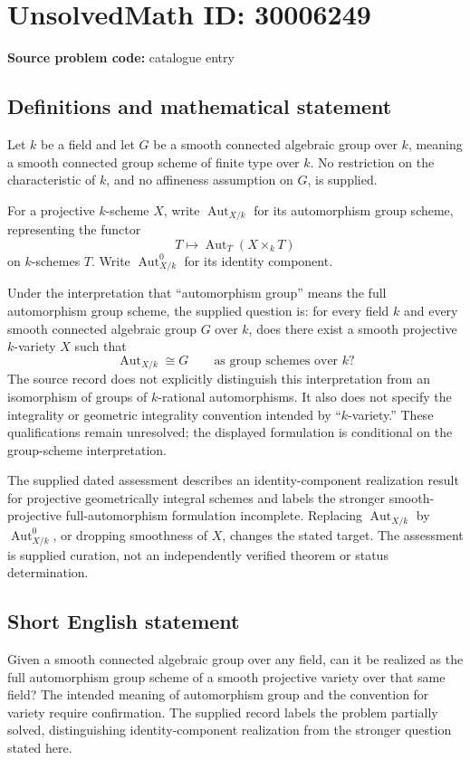 \documentclass[11pt]{article}
\begin{document}
\section*{UnsolvedMath ID: 30006249}
\textbf{Source problem code:} catalogue entry
\subsection{Definitions and mathematical statement}
Let \(k\) be a field and let \(G\) be a smooth connected algebraic group over \(k\), meaning a smooth connected group scheme of finite type over \(k\). No restriction on the characteristic of \(k\), and no affineness assumption on \(G\), is supplied.

For a projective \(k\)-scheme \(X\), write \(\operatorname{Aut}_{X/k}\) for its automorphism group scheme, representing the functor
\[
T\longmapsto \operatorname{Aut}_T(X\times_k T)
\]
on \(k\)-schemes \(T\). Write \(\operatorname{Aut}_{X/k}^{0}\) for its identity component.

Under the interpretation that ``automorphism group'' means the full automorphism group scheme, the supplied question is: for every field \(k\) and every smooth connected algebraic group \(G\) over \(k\), does there exist a smooth projective \(k\)-variety \(X\) such that
\[
\operatorname{Aut}_{X/k}\cong G
\qquad\text{as group schemes over }k?
\]
The source record does not explicitly distinguish this interpretation from an isomorphism of groups of \(k\)-rational automorphisms. It also does not specify the integrality or geometric integrality convention intended by ``\(k\)-variety.'' These qualifications remain unresolved; the displayed formulation is conditional on the group-scheme interpretation.

The supplied dated assessment describes an identity-component realization result for projective geometrically integral schemes and labels the stronger smooth-projective full-automorphism formulation incomplete. Replacing \(\operatorname{Aut}_{X/k}\) by \(\operatorname{Aut}_{X/k}^{0}\), or dropping smoothness of \(X\), changes the stated target. The assessment is supplied curation, not an independently verified theorem or status determination.
\subsection{Short English statement}
Given a smooth connected algebraic group over any field, can it be realized as the full automorphism group scheme of a smooth projective variety over that same field? The intended meaning of automorphism group and the convention for variety require confirmation. The supplied record labels the problem partially solved, distinguishing identity-component realization from the stronger question stated here.
\end{document}
